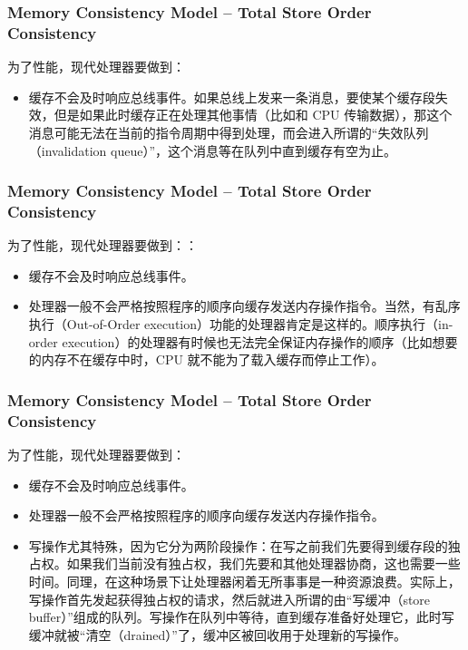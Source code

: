 \begin{frame}[plain]	
    \frametitle{Memory Consistency Model --  Total Store Order  Consistency}
    为了性能，现代处理器要做到：
    \begin{itemize}
        \item 缓存不会及时响应总线事件。如果总线上发来一条消息，要使某个缓存段失效，但是如果此时缓存正在处理其他事情（比如和 CPU 传输数据），那这个消息可能无法在当前的指令周期中得到处理，而会进入所谓的“失效队列（invalidation queue）”，这个消息等在队列中直到缓存有空为止。

    \end{itemize}
\end{frame}

\begin{frame}[plain]	
    \frametitle{Memory Consistency Model --  Total Store Order  Consistency}
    为了性能，现代处理器要做到：：
    \begin{itemize}
        \item 缓存不会及时响应总线事件。
        \item 处理器一般不会严格按照程序的顺序向缓存发送内存操作指令。当然，有乱序执行（Out-of-Order execution）功能的处理器肯定是这样的。顺序执行（in-order execution）的处理器有时候也无法完全保证内存操作的顺序（比如想要的内存不在缓存中时，CPU 就不能为了载入缓存而停止工作）。
    \end{itemize}
\end{frame}

\begin{frame}[plain]	
    \frametitle{Memory Consistency Model --  Total Store Order  Consistency}
    为了性能，现代处理器要做到：
    \begin{itemize}
        \item 缓存不会及时响应总线事件。
        \item 处理器一般不会严格按照程序的顺序向缓存发送内存操作指令。
        \item 写操作尤其特殊，因为它分为两阶段操作：在写之前我们先要得到缓存段的独占权。如果我们当前没有独占权，我们先要和其他处理器协商，这也需要一些时间。同理，在这种场景下让处理器闲着无所事事是一种资源浪费。实际上，写操作首先发起获得独占权的请求，然后就进入所谓的由“写缓冲（store buffer）”组成的队列。写操作在队列中等待，直到缓存准备好处理它，此时写缓冲就被“清空（drained）”了，缓冲区被回收用于处理新的写操作。
    \end{itemize}
\end{frame}

